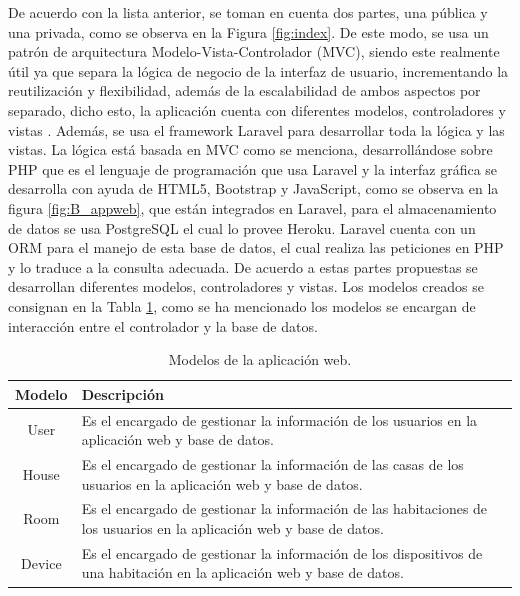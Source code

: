 De acuerdo con la lista anterior, se toman en cuenta dos partes, una pública y una privada, como se observa en la Figura \ref{fig:index}. De este modo, se usa un patrón de arquitectura Modelo-Vista-Controlador (MVC), siendo este realmente útil ya que separa la lógica de negocio de la interfaz de usuario, incrementando la reutilización y flexibilidad, además de la escalabilidad de ambos aspectos por separado, dicho esto, la aplicación cuenta con diferentes modelos, controladores y vistas \cite{MVC1}. Además, se usa el framework Laravel para desarrollar toda la lógica y las vistas. La lógica está basada en MVC como se menciona, desarrollándose sobre PHP que es el lenguaje de programación que usa Laravel y la interfaz gráfica se desarrolla con ayuda de HTML5, Bootstrap y JavaScript, como se observa en la figura \ref{fig:B_appweb}, que están integrados en Laravel, para el almacenamiento de datos se usa PostgreSQL el cual lo provee Heroku. Laravel cuenta con un ORM para el manejo de esta base de datos, el cual realiza las peticiones en PHP y lo traduce a la consulta adecuada. De acuerdo a estas partes propuestas se desarrollan diferentes modelos, controladores y vistas. Los modelos creados se consignan en la Tabla \ref{table:models}, como se ha mencionado los modelos se encargan de interacción entre el controlador y la base de datos.\\

\begin{table}
	\begin{center}
		\caption{Modelos de la aplicación web.}
		\label{table:models}
		\begin{tabular}{|c|p{7cm}|}
			\hline 
			\textbf{Modelo} & \textbf{Descripción} \\ 
			\hline 
			User & Es el encargado de gestionar la información de los usuarios en la aplicación web y base de datos.\\ 
			\hline 
			House & Es el encargado de gestionar la información de las casas de los usuarios en la aplicación web y base de datos.\\ 
			\hline 
			Room & Es el encargado de gestionar la información de las habitaciones de los usuarios en la aplicación web y base de datos.\\ 
			\hline 
			Device & Es el encargado de gestionar la información de los dispositivos de una habitación en la aplicación web y base de datos.\\
			\hline
		\end{tabular} 
	\end{center}
\end{table}

